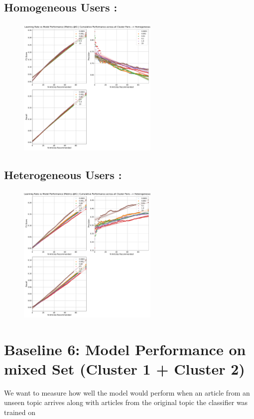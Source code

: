 \documentclass[a4paper,fontsize=9.0pt]{scrartcl}
\begin{document}
\subsection{Homogeneous Users :}
\vspace{-3ex}
\begin{figure}[H]
 \includegraphics[width=0.6\textwidth]{Graphs/lr_vs_model_performance_cumu_Homogeneous.pdf}
\end{figure}
\subsection{Heterogeneous Users :}
\vspace{-3ex}
\begin{figure}[H]
 \includegraphics[width=0.6\textwidth]{Graphs/lr_vs_model_performance_cumu_Heterogeneous.pdf}
\end{figure}

\vspace{1ex}
\section{Baseline 6: Model Performance on mixed Set (Cluster 1 + Cluster 2)}
\begin{flushleft}
We want to measure how well the model would perform when an article from an unseen topic arrives along with articles from the original topic the classifier was trained on
\end{flushleft}
\end{document}
